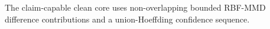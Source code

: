 The claim-capable clean core uses non-overlapping bounded RBF-MMD difference
contributions and a union-Hoeffding confidence sequence.
